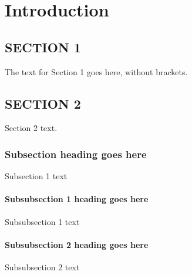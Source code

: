 \documentclass[phd,tocprelim]{cornell}
\begin{document}
\begin{acknowledgements}

\end{acknowledgements}

\contentspage
\tablelistpage
\figurelistpage

\normalspacing \setcounter{page}{1} 
\pagestyle{cornell} \addtolength{\parskip}{0.5\baselineskip}

\chapter{Introduction}

\section{SECTION 1}
The text for Section 1 goes here, without brackets.

\section{SECTION 2}
Section 2 text.

\subsection{Subsection heading goes here}

Subsection 1 text

\subsubsection{Subsubsection 1 heading goes here}
Subsubsection 1 text

\subsubsection{Subsubsection 2 heading goes here}
Subsubsection 2 text
\end{document}
